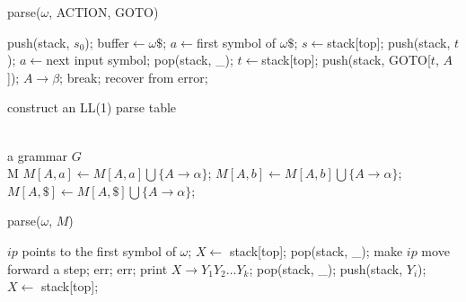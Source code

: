 \documentclass[11pt]{article}
\begin{document}
\begin{algorithm}[h]
    \caption{parse($\omega$, ACTION, GOTO)}
    \label{alg: lr1parse}
    \begin{algorithmic}[1]
    	\STATE push(stack, $s_0$);
    	\STATE buffer$\leftarrow \omega \$$;
    	\STATE $a \leftarrow$first symbol of $\omega \$$;
    	\WHILE {\TRUE}
    		\STATE $s \leftarrow$stack[top];
    			\STATE push(stack, $t$);
    			\STATE $a \leftarrow$next input symbol;
    				\STATE pop(stack, \_);
    			\ENDFOR
    			\STATE $t \leftarrow$stack[top];
    			\STATE push(stack, GOTO[$t$, $A$]);
    			\PRINT $A \rightarrow \beta$;
    			\STATE break;
    		\ELSE
    			\STATE recover from error;
    		\ENDIF
    	\ENDWHILE
    \end{algorithmic}
\end{algorithm}
\begin{algorithm}[h]         %
\caption{construct an LL(1) parse table}             %
\label{alg: ll1construct}
\begin{algorithmic}[1]                %
\REQUIRE ~~\\                          %
    a grammar $G$
\ENSURE ~~\\                           %
	M
		\STATE $M[A, a] \leftarrow M[A, a] \bigcup \{ A \rightarrow \alpha \}$;
	\ENDFOR
			\STATE $M[A, b] \leftarrow M[A, b] \bigcup \{ A \rightarrow \alpha \}$;
		\ENDFOR
			\STATE $M[A, \$] \leftarrow M[A, \$] \bigcup \{ A \rightarrow \alpha \}$;
		\ENDIF
	\ENDIF
\ENDFOR
\end{algorithmic}
\end{algorithm}

\begin{algorithm}[h]
    \caption{parse($\omega$, $M$)}
    \label{alg: ll1parse}
    \begin{algorithmic}[1]
    	\STATE $ip$ points to the first symbol of $\omega$;
    	\STATE $X \leftarrow$ stack[top];
    			\STATE pop(stack, \_);
    			\STATE make $ip$ move forward a step;
    			\STATE err;
    			\STATE err;
    			\STATE print $X \rightarrow Y_1 Y_2 \ldots Y_k$;
    			\STATE pop(stack, \_);
    				\STATE push(stack, $Y_i$);
    			\ENDFOR
    		\ENDIF
    		\STATE $X \leftarrow $ stack[top];
    	\ENDWHILE
    \end{algorithmic}
\end{algorithm}
\end{document}
